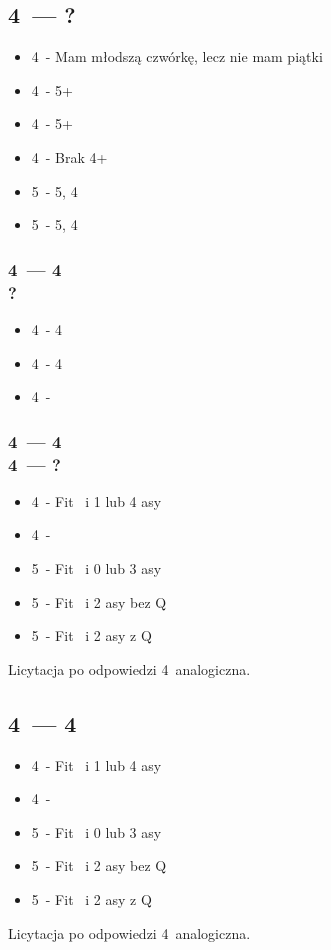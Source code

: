 \documentclass[12pt, a4paper]{article}
\begin{document}
    \subsection{4\clubs\ --- ?}
    \begin{itemize}
        \item 4\diams\ - Mam młodszą czwórkę, lecz nie mam piątki
        \item 4\hearts\ - 5+\clubs
        \item 4\spades\ - 5+\diams 
        \item 4\nt\ - Brak 4+ \minor \br
        \item 5\clubs\ - 5\clubs, 4\diams
        \item 5\diams\ - 5\diams, 4\clubs 
    \end{itemize}

    \subsubsection{4\clubs\ --- 4\diams \\ ?}
    \begin{itemize}
        \item 4\hearts\ - 4\clubs
        \item 4\spades\ - 4\diams
        \item 4\nt\ - \soff
    \end{itemize}

    \subsubsection{4\clubs\ --- 4\diams \\ 4\hearts\ --- ?}
    \begin{itemize}
        \item 4\spades\ - Fit \clubs\ i 1 lub 4 asy
        \item 4\nt\ - \soff
        \item 5\clubs\ - Fit \clubs\ i 0 lub 3 asy
        \item 5\diams\ - Fit \clubs\ i 2 asy bez \clubs Q
        \item 5\hearts\ - Fit \clubs\ i 2 asy z \clubs Q
    \end{itemize}
    Licytacja po odpowiedzi 4\spades\ analogiczna.

    \subsection{4\clubs\ --- 4\hearts}
    \begin{itemize}
        \item 4\spades\ - Fit \clubs\ i 1 lub 4 asy
        \item 4\nt\ - \soff
        \item 5\clubs\ - Fit \clubs\ i 0 lub 3 asy
        \item 5\diams\ - Fit \clubs\ i 2 asy bez \clubs Q
        \item 5\hearts\ - Fit \clubs\ i 2 asy z \clubs Q
    \end{itemize}
    Licytacja po odpowiedzi 4\spades\ analogiczna.
\end{document}
